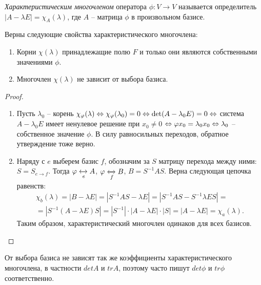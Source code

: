 \begin{definition}
    \textit{Характеристическим многочленом} оператора $\phi: V \to V$ называется определитель $|A - \lambda E| = \chi_A(\lambda)$, где $A$ -- матрица $\phi$ в произвольном базисе.
\end{definition}

\begin{theorem}
    Верны следующие свойства характеристического многочлена:
    \begin{enumerate}
        \item Корни $\chi(\lambda)$ принадлежащие полю $F$ и только они являются собственными 
        значениями $\phi$.
        \item Многочлен $\chi(\lambda)$ не зависит от выбора базиса.
    \end{enumerate} 
\end{theorem}

\begin{proof}
    \begin{enumerate}
        \item Пусть $\lambda_0$ -- корень $\chi_{\phi}(\lambda) \lra \chi_{\phi}(\lambda_0) = 0 \lra \det(A - \lambda_{0}E) = 0 \lra $ система $A - \lambda_{0}E$ имеет ненулевое решение при $x_0 \neq 0$ $\lra \phi x_{0} = \lambda_0 x_0 \lra \lambda_0$ -- собственное значение $\phi$. В силу равносильных переходов, обратное утверждение тоже верно. 
        \item Наряду с $e$ выберем базис $f$, обозначим за $S$ матрицу перехода между ними: 
        $S = S_{e \to f}$. Тогда $\phi \xleftrightarrow[e]{} A$, $\phi \xleftrightarrow[f]{} B$, 
        $B = S^{-1}AS$. Верна следующая цепочка равенств:
        \begin{eqnarray}
            \chi_b(\lambda) = |B - \lambda E| = |S^{-1}AS - \lambda E| 
            = |S^{-1}AS - S^{-1} \lambda E S| = \\ = |S^{-1}(A - \lambda E)S| 
            = |S^{-1}| \cdot |A - \lambda E| \cdot |S| = |A - \lambda E| = \chi_a(\lambda).
        \end{eqnarray}
        Таким образом, характеристический многочлен одинаков для всех базисов.
    \end{enumerate}
\end{proof}

\begin{corollary}
    От выбора базиса не зависят так же коэффициенты характеристического многочлена, в частности $det A$ и $tr A$, поэтому часто пишут $det \phi$ и $tr \phi$ соответственно.
\end{corollary}